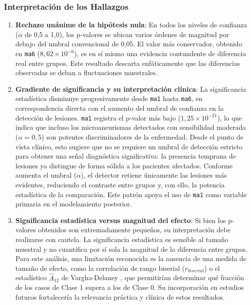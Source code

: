 \subsubsection{Interpretación de los Hallazgos}

\begin{enumerate}
    \item \textbf{Rechazo unánime de la hipótesis nula}: En todos los niveles de
    confianza ($\alpha$ de 0,5 a 1,0), los p-valores se ubican varios órdenes de
    magnitud por debajo del umbral convencional de 0,05. El valor más conservador,
    obtenido en \texttt{ma6} ($8{,}62 \times 10^{-6}$), es en sí mismo una evidencia
    contundente de diferencia real entre grupos. Este resultado descarta enfáticamente
    que las diferencias observadas se deban a fluctuaciones muestrales.

    \item \textbf{Gradiente de significancia y su interpretación clínica}: La
    significancia estadística disminuye progresivamente desde \texttt{ma1} hasta
    \texttt{ma6}, en correspondencia directa con el aumento del umbral de confianza
    en la detección de lesiones. \texttt{ma1} registra el p-valor más bajo
    ($1{,}25 \times 10^{-21}$), lo que indica que incluso los microaneurismas
    detectados con sensibilidad moderada ($\alpha = 0{,}5$) son potentes
    discriminadores de la enfermedad. Desde el punto de vista clínico, esto sugiere
    que no se requiere un umbral de detección estricto para obtener una señal
    diagnóstica significativa: la presencia temprana de lesiones ya distingue
    de forma sólida a los pacientes afectados. Conforme aumenta el umbral ($\alpha$),
    el detector retiene únicamente las lesiones más evidentes, reduciendo el
    contraste entre grupos y, con ello, la potencia estadística de la comparación.
    Este patrón apoya el uso de \texttt{ma1} como variable primaria en el modelamiento
    posterior.

    \item \textbf{Significancia estadística versus magnitud del efecto}: Si bien los
    p-valores obtenidos son extremadamente pequeños, su interpretación debe realizarse
    con cautela. La significancia estadística es sensible al tamaño muestral y no
    cuantifica por sí sola la magnitud de la diferencia entre grupos. Para este
    análisis, una limitación reconocida es la ausencia de una medida de tamaño de
    efecto, como la correlación de rango biserial ($r_{biserial}$) o el estadístico
    $\hat{A}_{12}$ de Vargha-Delaney \parencite{vargha2000critique}, que permitirían
    determinar qué fracción de los casos de Clase 1 supera a los de Clase 0. Su
    incorporación en estudios futuros fortalecería la relevancia práctica y clínica
    de estos resultados.


\end{enumerate}
